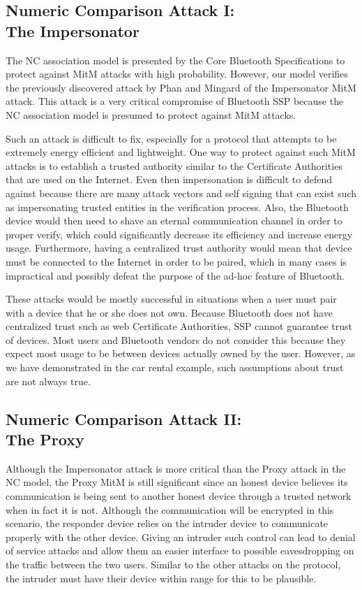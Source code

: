 \documentclass{acm_proc_article-sp}
\begin{document}
\subsection{Numeric Comparison Attack I:\\The Impersonator}
The NC association model is presented by the Core Bluetooth Specifications \cite{bluetooth:sig4} to protect against MitM attacks with high probability. However, our model verifies the previously discovered attack by Phan and Mingard \cite{phan:mingard} of the Impersonator MitM attack. This attack is a very critical compromise of Bluetooth SSP because the NC association model is presumed to protect against MitM attacks.

Such an attack is difficult to fix, especially for a protocol that attempts to be extremely energy efficient and lightweight. One way to protect against such MitM attacks is to establish a trusted authority similar to the Certificate Authorities that are used on the Internet. Even then impersonation is difficult to defend against because there are many attack vectors and self signing that can exist such as impersonating trusted entities in the verification process. Also, the Bluetooth device would then need to shave an eternal communication channel in order to proper verify, which could significantly decrease its efficiency and increase energy usage. Furthermore, having a centralized trust authority would mean that device must be connected to the Internet in order to be paired, which in many cases is impractical and possibly defeat the purpose of the ad-hoc feature of Bluetooth.

These attacks would be mostly successful in situations when a user must pair with a device that he or she does not own. Because Bluetooth does not have centralized trust such as web Certificate Authorities, SSP cannot guarantee trust of devices. Most users and Bluetooth vendors do not consider this because they expect most usage to be between devices actually owned by the user. However, as we have demonstrated in the car rental example, such assumptions about trust are not always true.

\subsection{Numeric Comparison Attack II:\\The Proxy}
Although the Impersonator attack is more critical than the Proxy attack in the NC model, the Proxy MitM is still significant since an honest device believes its communication is being sent to another honest device through a trusted network when in fact it is not. Although the communication will be encrypted in this scenario, the responder device relies on the intruder device to communicate properly with the other device. Giving an intruder such control can lead to denial of service attacks and allow them an easier interface to possible eavesdropping on the traffic between the two users. Similar to the other attacks on the protocol, the intruder must have their device within range for this to be plausible.
\end{document}
